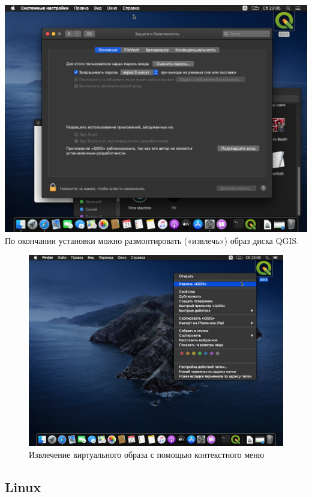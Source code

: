 \documentclass[
  12pt,
]{book}
\begin{document}
\includegraphics{images/installation_instruction_mac/mac08.png}
По окончании установки можно размонтировать («извлечь») образ диска QGIS.

\begin{figure}
\centering
\includegraphics{images/installation_instruction_mac/mac09.png}
\caption{Извлечение виртуального образа с помощью контекстного меню}
\end{figure}

\hypertarget{linux}{%
\subsection*{Linux}\label{linux}}
\end{document}

